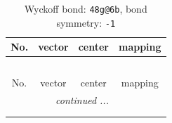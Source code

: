 \documentclass[fleqn,8pt]{jsarticle}
\begin{document}
\renewcommand{\arraystretch}{1.2}
\begin{longtable}{cccc}
\caption{Wyckoff bond: {\tt 48g@6b}, bond symmetry: {\tt -1}}
 \\
 \hline \hline
No. & vector & center & mapping \\ \hline \endfirsthead

\multicolumn{3}{l}{\tablename\ \thetable{}} \\
 \hline \hline
No. & vector & center & mapping \\ \hline \endhead

 \hline \hline
\multicolumn{3}{r}{\footnotesize\it continued ...} \\ \endfoot

 \hline \hline
\multicolumn{3}{r}{} \\ \endlastfoot


\end{longtable}
\end{document}
